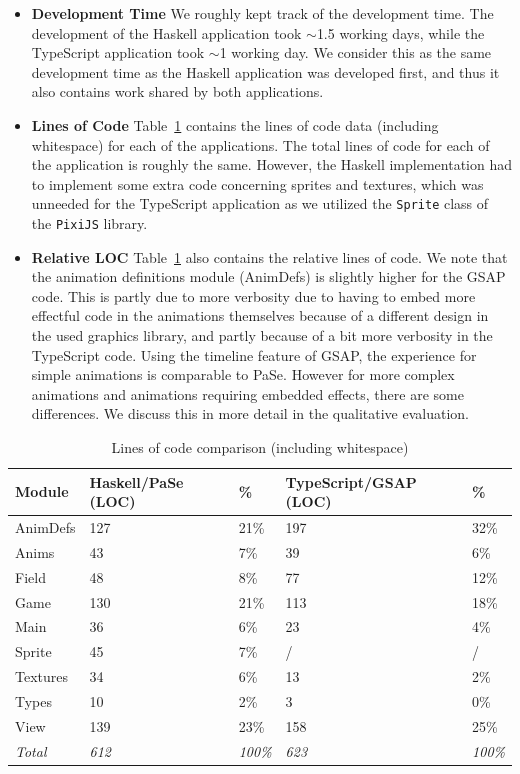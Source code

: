 \begin{itemize}
\item \textbf{Development Time} We roughly kept track of the development time. The development of the Haskell application took $\sim$1.5 working days, while the TypeScript application took $\sim$1 working day. We consider this as the same development time as the Haskell application was developed first, and thus it also contains work shared by both applications.
\item \textbf{Lines of Code} Table~\ref{tbl:loc} contains the lines of code data (including whitespace) for each of the applications. The total lines of code for each of the application is roughly the same. However, the Haskell implementation had to implement some extra code concerning sprites and textures, which was unneeded for the TypeScript application as we utilized the \texttt{Sprite} class of the \texttt{PixiJS} library.
\item \textbf{Relative LOC} Table~\ref{tbl:loc} also contains the relative lines of code. We note that the animation definitions module (AnimDefs) is slightly higher for the GSAP code. This is partly due to more verbosity due to having to embed more effectful code in the animations themselves because of a different design in the used graphics library, and partly because of a bit more verbosity in the TypeScript code. Using the timeline feature of GSAP, the experience for simple animations is comparable to PaSe. However for more complex animations and animations requiring embedded effects, there are some differences. We discuss this in more detail in the qualitative evaluation.
\end{itemize}

\begin{table}
\caption{Lines of code comparison (including whitespace)}
\centering
\label{tbl:loc}
\begin{center}
\begin{tabular}{l@{\hskip 0.5cm}ll@{\hskip 0.2cm}ll}
 Module & Haskell/PaSe (LOC) & \% & TypeScript/GSAP (LOC) & \% \\
 \hline
 AnimDefs & 127 & 21\% & 197 & 32\% \\ 
 Anims & 43 & 7\% & 39 & 6\% \\  
 Field & 48 & 8\% & 77 & 12\% \\  
 Game & 130 & 21\% & 113 & 18\% \\  
 Main & 36 & 6\% & 23 & 4\% \\  
 Sprite & 45 & 7\% & / & / \\  
 Textures & 34 & 6\% & 13 & 2\% \\  
 Types & 10 & 2\% & 3 & 0\% \\  
 View & 139 & 23\% & 158 & 25\% \\
 \emph{Total} & \emph{612} & \emph{100\%} & \emph{623} & \emph{100\%}
\end{tabular}
\end{center}
\end{table}

